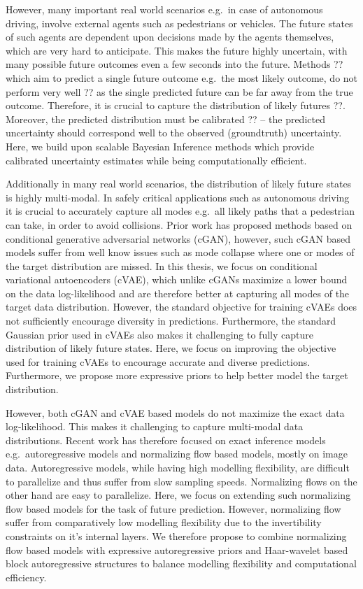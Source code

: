 However,  many important real world scenarios e.g.\ in case of autonomous driving,  involve external agents such as pedestrians or vehicles.  The future states of such agents are dependent upon decisions made by the agents themselves,  which are very hard to anticipate.  This makes the future highly uncertain,  with many possible future outcomes even a few seconds into the future.  Methods ?? which aim to predict a single future outcome e.g.\ the most likely outcome, do not perform very well ?? as the single predicted future can be far away from the true outcome.  Therefore,  it is crucial to capture the distribution of likely futures ??.  Moreover,  the predicted distribution must be calibrated ?? -- the predicted uncertainty should correspond well to the observed (groundtruth) uncertainty.  Here,  we build upon scalable Bayesian Inference methods which provide calibrated uncertainty estimates while being computationally efficient.  

Additionally in many real world scenarios,  the distribution of likely future states is highly multi-modal.  In safely critical applications such as autonomous driving it is crucial to accurately capture all modes e.g.\ all likely paths that a pedestrian can take,  in order to avoid collisions.  Prior work has proposed methods based on conditional generative adversarial networks (cGAN),  however,  such cGAN based models suffer from well know issues such as mode collapse where one or modes of the target distribution are missed.  In this thesis,  we focus on conditional variational autoencoders (cVAE),  which unlike cGANs maximize a lower bound on the data log-likelihood and are therefore better at capturing all modes of the target data distribution.  However,  the  standard objective for training cVAEs does not sufficiently encourage diversity in predictions.  Furthermore,  the standard Gaussian prior used in cVAEs also makes it challenging to fully capture distribution of likely future states.  Here,  we focus on improving the objective used for training cVAEs to encourage accurate and diverse predictions.  Furthermore,  we propose more expressive priors to help better model the target distribution.

However,  both cGAN and cVAE based models do not maximize the exact data log-likelihood. This makes it challenging to capture multi-modal data distributions.  Recent work has therefore focused on exact inference models e.g.\ autoregressive models and normalizing flow based models, mostly on image data.  Autoregressive models, while having high modelling flexibility, are difficult to parallelize and thus suffer from slow sampling speeds. Normalizing flows on the other hand are easy to parallelize. Here, we focus on extending such normalizing flow based models for the task of future prediction. However, normalizing flow suffer from comparatively low modelling flexibility due to the invertibility constraints on it's internal layers. We therefore propose to combine normalizing flow based models with expressive autoregressive priors and   Haar-wavelet based block autoregressive structures to balance modelling flexibility and computational efficiency.


